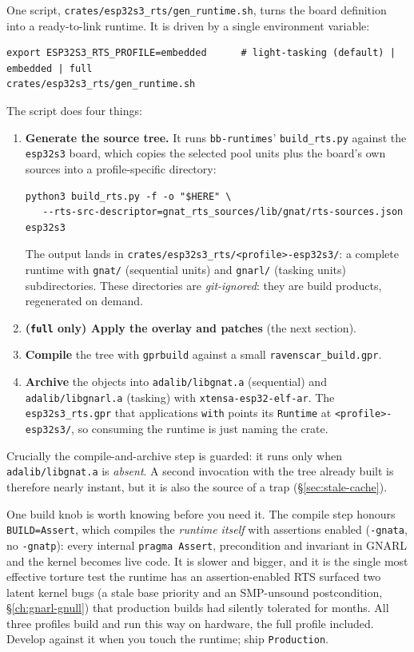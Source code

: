 One script, \texttt{crates/esp32s3\_rts/gen\_runtime.sh}, turns the board
definition into a ready-to-link runtime. It is driven by a single environment
variable:

\begin{lstlisting}[style=sh]
export ESP32S3_RTS_PROFILE=embedded      # light-tasking (default) | embedded | full
crates/esp32s3_rts/gen_runtime.sh
\end{lstlisting}

The script does four things:

\begin{enumerate}
\item \textbf{Generate the source tree.} It runs \texttt{bb-runtimes}'
  \texttt{build\_rts.py} against the \texttt{esp32s3} board, which copies the
  selected pool units plus the board's own sources into a profile-specific
  directory:
\begin{lstlisting}[style=sh]
python3 build_rts.py -f -o "$HERE" \
   --rts-src-descriptor=gnat_rts_sources/lib/gnat/rts-sources.json esp32s3
\end{lstlisting}
  The output lands in \texttt{crates/esp32s3\_rts/<profile>-esp32s3/}: a
  complete runtime with \texttt{gnat/} (sequential units) and \texttt{gnarl/}
  (tasking units) subdirectories. These directories are \emph{git-ignored}: they
  are build products, regenerated on demand.
\item \textbf{(\texttt{full} only) Apply the overlay and patches} (the next
  section).
\item \textbf{Compile} the tree with \texttt{gprbuild} against a small
  \texttt{ravenscar\_build.gpr}.
\item \textbf{Archive} the objects into \texttt{adalib/libgnat.a} (sequential)
  and \texttt{adalib/libgnarl.a} (tasking) with \texttt{xtensa-esp32-elf-ar}.
  The \texttt{esp32s3\_rts.gpr} that applications \texttt{with} points its
  \texttt{Runtime} at \texttt{<profile>-esp32s3/}, so consuming the runtime is
  just naming the crate.
\end{enumerate}

Crucially the compile-and-archive step is guarded: it runs only when
\texttt{adalib/libgnat.a} is \emph{absent}. A second invocation with the tree
already built is therefore nearly instant, but it is also the source of a trap
(\S\ref{sec:stale-cache}).

One build knob is worth knowing before you need it.
\index{-gnata!runtime} The compile step honours \texttt{BUILD=Assert}, which
compiles the \emph{runtime itself} with assertions enabled
(\texttt{-gnata}, no \texttt{-gnatp}): every internal
\texttt{pragma Assert}, precondition and invariant in GNARL and the kernel
becomes live code. It is slower and bigger, and it is the single most
effective torture test the runtime has \textemdash{} an assertion-enabled RTS
surfaced two latent kernel bugs (a stale base priority and an SMP-unsound
postcondition, \S\ref{ch:gnarl-gnull}) that production builds had silently
tolerated for months. All three profiles build and run this way on hardware,
the full profile included. Develop against it when you touch the runtime;
ship \texttt{Production}.

